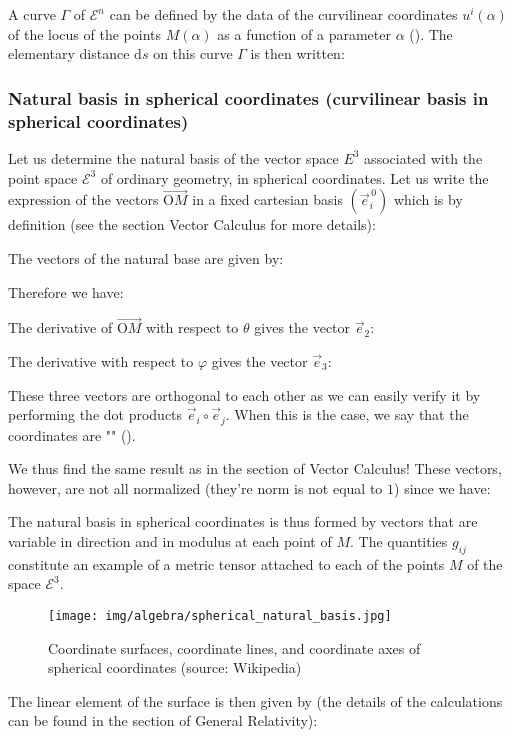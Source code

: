 	A curve $\Gamma$  of $\mathcal{E}^n$ can be defined by the data of the curvilinear coordinates $u^i(\alpha)$ of the locus of the points $M(\alpha)$ as a function of a parameter $\alpha$ (). The elementary distance $\mathrm{d}s$ on this curve $\Gamma$ is then written:
	
	
	\subsubsection{Natural basis in spherical coordinates (curvilinear basis in spherical coordinates)}
	Let us determine the natural basis of the vector space $E^3$ associated with the point space $\mathcal{E}^3$ of ordinary geometry, in spherical coordinates. Let us write the expression of the vectors $\overrightarrow{\text{O}M}$ in a fixed cartesian basis $(\vec{e}_i^{\,0})$ which is by definition (see the section Vector Calculus for more details):
	
	The vectors of the natural base are given by:
	
	Therefore we have:
	
	The derivative of $\overrightarrow{\text{O}M}$ with respect to $\theta$ gives the vector $\vec{e}_2$:
	
	The derivative with respect to $\varphi$ gives the vector $\vec{e}_3$:
	
	These three vectors are orthogonal to each other as we can easily verify it by performing the dot products $\vec{e}_i\circ\vec{e}_j$. When this is the case, we say that the coordinates are "" ().

	We thus find the same result as in the section of Vector Calculus! These vectors, however, are not all normalized (they're norm is not equal to $1$) since we have:
	
	The natural basis in spherical coordinates is thus formed by vectors that are variable in direction and in modulus at each point of $M$. The quantities $g_{ij}$ constitute an example of a metric tensor attached to each of the points $M$ of the space $\mathcal{E}^3$.
	\begin{figure}[H]
		\centering
		\texttt{[image: img/algebra/spherical\_natural\_basis.jpg]}
		\caption[Coordinate surfaces, coordinate lines, and coordinate axes of spherical coordinates]{Coordinate surfaces, coordinate lines, and coordinate axes of spherical coordinates (source: Wikipedia)}
	\end{figure}
	The linear element of the surface is then given by (the details of the calculations can be found in the section of General Relativity):
	

